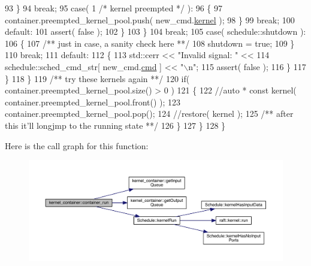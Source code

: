 \begin{DoxyCode}
93                   \}
94                   \textcolor{keywordflow}{break};
95                   \textcolor{keywordflow}{case}( 1 \textcolor{comment}{/* kernel preempted */} ):
96                   \{
97                      container.preempted\_kernel\_pool.push( new\_cmd.\hyperlink{structsched__cmd__t_a8f78af789430b7661f52de7365abcdbc}{kernel} );
98                   \}
99                   \textcolor{keywordflow}{break};
100                   \textcolor{keywordflow}{default}:
101                      assert( \textcolor{keyword}{false} );
102                \}
103             \}
104             \textcolor{keywordflow}{break};
105             \textcolor{keywordflow}{case}( schedule::shutdown ):
106             \{\textcolor{comment}{}
107 \textcolor{comment}{               /** just in case, a sanity check here **/}
108                shutdown = \textcolor{keyword}{true};
109             \}
110             \textcolor{keywordflow}{break};
111             \textcolor{keywordflow}{default}:
112             \{
113                std::cerr << \textcolor{stringliteral}{"Invalid signal: "} << 
114                   schedule::sched\_cmd\_str[ new\_cmd.\hyperlink{structsched__cmd__t_ab4ecf8a7b468db75074c0ba1493caac7}{cmd} ] << \textcolor{stringliteral}{"\(\backslash\)n"};
115                assert( \textcolor{keyword}{false} );
116             \}
117          \}
118       \}\textcolor{comment}{}
119 \textcolor{comment}{      /** try these kernels again **/}
120       \textcolor{keywordflow}{if}( container.preempted\_kernel\_pool.size() > 0 )
121       \{
122          \textcolor{comment}{//auto * const kernel( container.preempted\_kernel\_pool.front() );}
123          container.preempted\_kernel\_pool.pop();
124          \textcolor{comment}{//restore( kernel );}\textcolor{comment}{}
125 \textcolor{comment}{         /** after this it'll longjmp to the running state **/} 
126       \}
127    \}
128 \}
\end{DoxyCode}
Here is the call graph for this function\+:
\nopagebreak
\begin{figure}[H]
\begin{center}
\leavevmode
\includegraphics[width=350pt]{classkernel__container_a89f9b11119d9ab0e8c64215bf50856f0_cgraph}
\end{center}
\end{figure}
\hypertarget{classkernel__container_abcbec3854917b37bd6421b6b8ed2c2c0}{}\label{classkernel__container_abcbec3854917b37bd6421b6b8ed2c2c0} 
